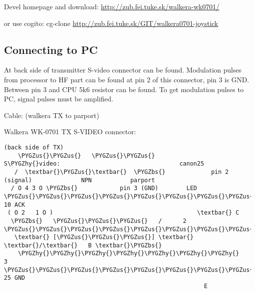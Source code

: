 \documentclass[a4paper,8pt,english]{sphinxmanual}
\def\PYGZbs{\char`\\}
\def\PYGZus{\char`\_}
\def\PYGZhy{\char`\-}
\begin{document}
Devel homepage and download:
\href{http://zub.fei.tuke.sk/walkera-wk0701/}{http://zub.fei.tuke.sk/walkera-wk0701/}

or use cogito:
cg-clone \href{http://zub.fei.tuke.sk/GIT/walkera0701-joystick}{http://zub.fei.tuke.sk/GIT/walkera0701-joystick}


\subsection{Connecting to PC}
\label{input/devices/walkera0701:connecting-to-pc}
At back side of transmitter S-video connector can be found. Modulation
pulses from processor to HF part can be found at pin 2 of this connector,
pin 3 is GND. Between pin 3 and CPU 5k6 resistor can be found. To get
modulation pulses to PC, signal pulses must be amplified.

Cable: (walkera TX to parport)

Walkera WK-0701 TX S-VIDEO connector:

\begin{Verbatim}[commandchars=\\\{\}]
(back side of TX)
    \PYGZus{}\PYGZus{}   \PYGZus{}\PYGZus{}              S\PYGZhy{}video:                                  canon25
   /  \textbar{}\PYGZus{}\textbar{}  \PYGZbs{}             pin 2 (signal)              NPN           parport
  / O 4 3 O \PYGZbs{}            pin 3 (GND)        LED        \PYGZus{}\PYGZus{}\PYGZus{}\PYGZus{}\PYGZus{}\PYGZus{}\PYGZus{}\PYGZus{}\PYGZus{}\PYGZus{}\PYGZus{}\PYGZus{}\PYGZus{}\PYGZus{}\PYGZus{}\PYGZus{}  10 ACK
 ( O 2   1 O )                                         \textbar{} C
  \PYGZbs{}   \PYGZus{}\PYGZus{}\PYGZus{}   /      2 \PYGZus{}\PYGZus{}\PYGZus{}\PYGZus{}\PYGZus{}\PYGZus{}\PYGZus{}\PYGZus{}\PYGZus{}\PYGZus{}\PYGZus{}\PYGZus{}\PYGZus{}\PYGZus{}\PYGZus{}\PYGZus{}\PYGZus{}\PYGZus{}\PYGZus{}\PYGZus{}\PYGZus{}\PYGZus{}\PYGZus{}\PYGZus{}\textbar{}\PYGZbs{}\textbar{}\PYGZus{}\PYGZus{}\PYGZus{}\PYGZus{}\PYGZus{}\textbar{}/
   \textbar{} [\PYGZus{}\PYGZus{}\PYGZus{}] \textbar{}                                 \textbar{}/\textbar{}   B \textbar{}\PYGZbs{}
    \PYGZhy{}\PYGZhy{}\PYGZhy{}\PYGZhy{}\PYGZhy{}\PYGZhy{}\PYGZhy{}        3 \PYGZus{}\PYGZus{}\PYGZus{}\PYGZus{}\PYGZus{}\PYGZus{}\PYGZus{}\PYGZus{}\PYGZus{}\PYGZus{}\PYGZus{}\PYGZus{}\PYGZus{}\PYGZus{}\PYGZus{}\PYGZus{}\PYGZus{}\PYGZus{}\PYGZus{}\PYGZus{}\PYGZus{}\PYGZus{}\PYGZus{}\PYGZus{}\PYGZus{}\PYGZus{}\PYGZus{}\PYGZus{}\PYGZus{}\PYGZus{}\PYGZus{}\PYGZus{}\PYGZus{}\PYGZus{}\textbar{}\PYGZus{}\PYGZus{}\PYGZus{}\PYGZus{}\PYGZus{}\PYGZus{}\PYGZus{}\PYGZus{}\PYGZus{}\PYGZus{}\PYGZus{}\PYGZus{}\PYGZus{}\PYGZus{}\PYGZus{}\PYGZus{} 25 GND
                                                         E
\end{Verbatim}
\end{document}
